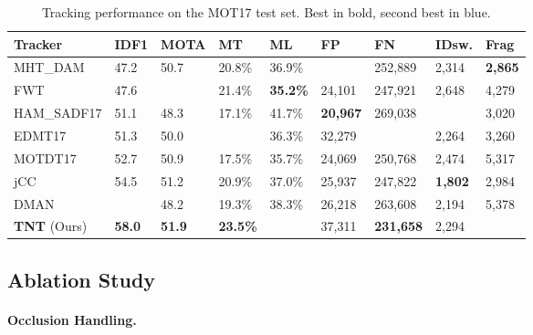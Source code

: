 \documentclass[10pt,twocolumn,letterpaper]{article}
\begin{document}
\begin{table*}
\begin{center}
\begin{tabular}{|L{2.9cm}|C{1.2cm}|C{1.3cm}|C{1.2cm}|C{1.2cm}|C{1.2cm}|C{1.2cm}|C{1.2cm}|C{1.2cm}|}
\hline
Tracker & IDF1  & MOTA  & MT  & ML  & FP  & FN  & IDsw.  & Frag  \\
\hline\hline
MHT\_DAM \cite{kim2015multiple} & 47.2 & 50.7 & 20.8\% & 36.9\% & \noindent\color{cyan}{22,875} & 252,889 & 2,314 & \textbf{2,865} \\
FWT \cite{henschel2018fusion} & 47.6 & \noindent\color{cyan}{51.3} & 21.4\% & \textbf{35.2\%} & 24,101 & 247,921 & 2,648 & 4,279 \\
HAM\_SADF17 \cite{yoon2018online} & 51.1 & 48.3 & 17.1\% & 41.7\% & \textbf{20,967} & 269,038 & \noindent\color{cyan}{1,871} & 3,020 \\
EDMT17 \cite{chen2017enhancing} & 51.3 & 50.0 & \noindent\color{cyan}{21.6\%} & 36.3\% & 32,279 & \noindent\color{cyan}{247,297} & 2,264 & 3,260 \\
MOTDT17 \cite{long2018real} & 52.7 & 50.9 & 17.5\% & 35.7\% & 24,069 & 250,768 & 2,474 & 5,317 \\
jCC \cite{keuper2018motion} & 54.5 & 51.2 & 20.9\% & 37.0\% & 25,937 & 247,822 & \textbf{1,802} & 2,984 \\
DMAN \cite{zhu2018online} & \noindent\color{cyan}{55.7} & 48.2 & 19.3\% & 38.3\% & 26,218 & 263,608 & 2,194 & 5,378 \\
\hline
\textbf{TNT} (Ours) & \textbf{58.0} & \textbf{51.9} & \textbf{23.5\%} & \noindent\color{cyan}{35.5\%} & 37,311 & \textbf{231,658} & 2,294 & \noindent\color{cyan}{2,917} \\
\hline
\end{tabular}
\end{center}
\caption{Tracking performance on the MOT17 test set. Best in bold, second best in blue. 
}
\label{tab:mot17}
\end{table*}

\subsection{Ablation Study} 



\paragraph{Occlusion Handling.}
\end{document}

